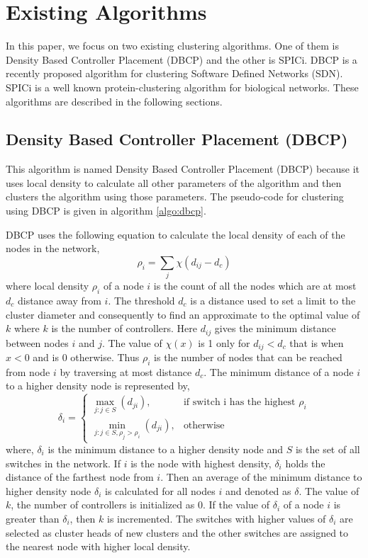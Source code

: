 \documentclass[times]{dacauth}
\begin{document}
\section{Existing Algorithms} \label{existingalgo}
In this paper, we focus on two existing clustering algorithms. One of them is Density Based Controller Placement (DBCP) and the other is SPICi. DBCP \cite{dbcp2017} is a recently proposed algorithm for clustering Software Defined Networks (SDN). SPICi\cite{spici2010} is a well known protein-clustering algorithm for biological networks. These algorithms are described in the following sections. 
\subsection{Density Based Controller Placement (DBCP)\cite{dbcp2017}} \label{dbcp}
This algorithm is named Density Based Controller Placement (DBCP) because it uses local density to calculate all other parameters of the algorithm and then clusters the algorithm using those parameters. The pseudo-code for clustering using DBCP is given in algorithm \ref{algo:dbcp}.

\smallskip
DBCP uses the following equation to calculate the local density of each of the nodes in the network,
\begin{equation} \label{dbcp:density}
\rho_i=\sum_j\chi(d_{ij}-d_c)
\end{equation}
where local density $\rho_i$ of a node $i$ is the count of all the nodes which are at most $d_c$ distance away from $i$. The threshold $d_c$ is a distance used to set a limit to the cluster diameter and consequently to find an approximate to the optimal value of $k$ where $k$ is the number of controllers.
Here $d_{ij}$ gives the minimum distance between nodes $i$ and $j$. The value of $\chi(x)$ is 1 only for $d_{ij}<d_c$ that is when $x<0$ and is 0 otherwise. Thus $\rho_i$ is the number of nodes that can be reached from node $i$ by traversing at most distance $d_c$.
The minimum distance of a node $i$ to a higher density node is represented by,
\begin{equation} \label{dbcp:mindistohi}
\delta_i=\begin{cases}
\max_{j:j\in S}(d_{ji}), & \text{if switch i has the highest $\rho_i$}\\
\min_{j:j\in S,\rho_j>\rho_i}(d_{ji}), & \text{otherwise}
\end{cases}
\end{equation}
where, $\delta_i$ is the minimum distance to a higher density node and $S$ is the set of all switches in the network. If $i$ is the node with highest density, $\delta_i$ holds the distance of the farthest node from $i$. Then an average of the minimum distance to higher density node $\delta_i$ is calculated for all nodes $i$ and denoted as $\delta$. The value of $k$, the number of controllers is initialized as $0$. If the value of $\delta_i$ of a node $i$ is greater than $\delta_i$, then $k$ is incremented. The switches with higher values of $\delta_i$ are selected as cluster heads of new clusters and the other switches are assigned to the nearest node with higher local density.
\end{document}
